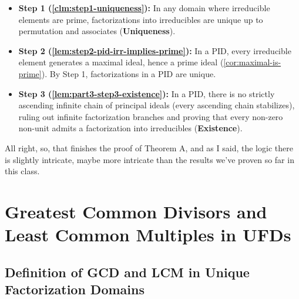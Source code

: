 \begin{content}

\begin{steps}
\begin{itemize}
    \item \textbf{Step 1 (\cref{clm:step1-uniqueness}):} In any domain where irreducible elements are prime, factorizations into irreducibles are unique up to permutation and associates (\textbf{Uniqueness}).
    \item \textbf{Step 2 (\cref{lem:step2-pid-irr-implies-prime}):} In a PID, every irreducible element generates a maximal ideal, hence a prime ideal (\cref{cor:maximal-is-prime}). By Step 1, factorizations in a PID are unique.
    \item \textbf{Step 3 (\cref{lem:part3-step3-existence}):} In a PID, there is no strictly ascending infinite chain of principal ideals (every ascending chain stabilizes), ruling out infinite factorization branches and proving that every non-zero non-unit admits a factorization into irreducibles (\textbf{Existence}).
\end{itemize}
\end{steps}
\end{content}

\begin{speech}[01:14:44 - 01:15:54]

All right, so, that finishes the proof of Theorem A, and as I said, the logic there is slightly intricate, maybe more intricate than the results we've proven so far in this class.
\end{speech}

\section{Greatest Common Divisors and Least Common Multiples in UFDs}

\subsection{Definition of GCD and LCM in Unique Factorization Domains}

